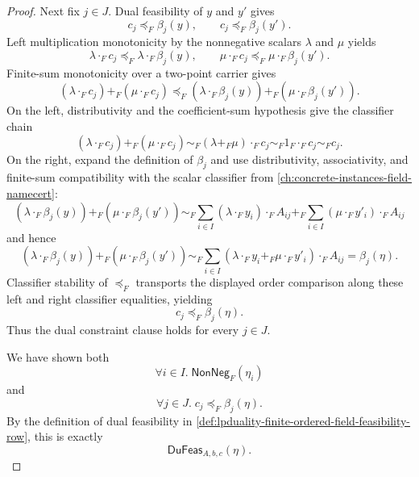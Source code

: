 \begin{proof}
Next fix $j\in J$. Dual feasibility of $y$ and $y'$ gives
$$
c_j\preceq_F\beta_j(y),
\qquad
c_j\preceq_F\beta_j(y').
$$
Left multiplication monotonicity by the nonnegative scalars $\lambda$ and $\mu$ yields
$$
\lambda\cdot_F c_j\preceq_F\lambda\cdot_F\beta_j(y),
\qquad
\mu\cdot_F c_j\preceq_F\mu\cdot_F\beta_j(y').
$$
Finite-sum monotonicity over a two-point carrier gives
$$
(\lambda\cdot_F c_j)+_F(\mu\cdot_F c_j)
\preceq_F
(\lambda\cdot_F\beta_j(y))+_F(\mu\cdot_F\beta_j(y')).
$$
On the left, distributivity and the coefficient-sum hypothesis give the classifier chain
$$
(\lambda\cdot_F c_j)+_F(\mu\cdot_F c_j)
\sim_F
(\lambda+_F\mu)\cdot_F c_j
\sim_F
1_F\cdot_F c_j
\sim_F
c_j.
$$
On the right, expand the definition of $\beta_j$ and use distributivity, associativity, and finite-sum compatibility with the scalar classifier from \autoref{ch:concrete-instances-field-namecert}:
$$
(\lambda\cdot_F\beta_j(y))+_F(\mu\cdot_F\beta_j(y'))
\sim_F
\sum_{i\in I}(\lambda\cdot_F y_i)\cdot_F A_{ij}
+_F
\sum_{i\in I}(\mu\cdot_F y'_i)\cdot_F A_{ij}
$$
and hence
$$
(\lambda\cdot_F\beta_j(y))+_F(\mu\cdot_F\beta_j(y'))
\sim_F
\sum_{i\in I}(\lambda\cdot_F y_i+_F\mu\cdot_F y'_i)\cdot_F A_{ij}
=
\beta_j(\eta).
$$
Classifier stability of $\preceq_F$ transports the displayed order comparison along these left and right classifier equalities, yielding
$$
c_j\preceq_F\beta_j(\eta).
$$
Thus the dual constraint clause holds for every $j\in J$.

We have shown both
$$
\forall i\in I.\; \mathsf{NonNeg}_F(\eta_i)
$$
and
$$
\forall j\in J.\; c_j\preceq_F\beta_j(\eta).
$$
By the definition of dual feasibility in \autoref{def:lpduality-finite-ordered-field-feasibility-row}, this is exactly
$$
\mathsf{DuFeas}_{A,b,c}(\eta).
$$
\end{proof}

